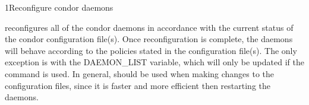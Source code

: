 \begin{ManPage}{}{1}{Reconfigure condor daemons}
\label{man-condor-reconfig}
\Synopsis {}

\Description 

 reconfigures all of the condor daemons in accordance with 
the current
status of the condor configuration file(s).  Once reconfiguration is complete,
the daemons will behave according to the policies stated in the configuration
file(s).  The only exception is with the DAEMON\_LIST variable, which will only be
updated if the  command is used.  In general,
 should be used when making changes to the configuration
files, since it is faster and more efficient then restarting the daemons.


\begin{Options}
\end{Options}

\end{ManPage}
